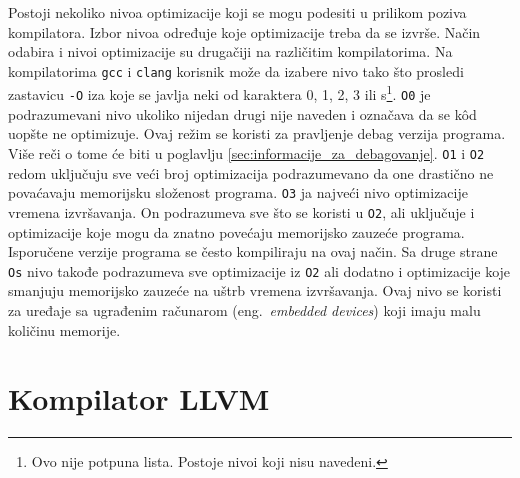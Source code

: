 \documentclass[12pt,oneside]{memoir}
\begin{document}

Postoji nekoliko nivoa optimizacije koji se mogu podesiti u prilikom poziva kompilatora.
Izbor nivoa određuje koje optimizacije treba da se izvrše.
Način odabira i nivoi optimizacije su drugačiji na različitim kompilatorima.
Na kompilatorima \verb|gcc| i \verb|clang| korisnik može da izabere nivo tako što prosledi zastavicu \verb|-O| iza koje se javlja neki od karaktera 0, 1, 2, 3 ili s\footnote{Ovo nije potpuna lista. Postoje nivoi koji nisu navedeni.}.
\verb|O0| je podrazumevani nivo ukoliko nijedan drugi nije naveden i označava da se k\^od uopšte ne optimizuje.
Ovaj režim se koristi za pravljenje debag verzija programa.
Više reči o tome će biti u poglavlju \ref{sec:informacije_za_debagovanje}.
\verb|O1| i \verb|O2| redom uključuju sve veći broj optimizacija podrazumevano da one drastično ne povaćavaju memorijsku složenost programa.
\verb|O3| ja najveći nivo optimizacije vremena izvršavanja.
On podrazumeva sve što se koristi u \verb|O2|, ali uključuje i optimizacije koje mogu da znatno povećaju memorijsko zauzeće programa.
Isporučene verzije programa se često kompiliraju na ovaj način.
Sa druge strane \verb|Os| nivo takođe podrazumeva sve optimizacije iz \verb|O2| ali dodatno i optimizacije koje smanjuju memorijsko zauzeće na uštrb vremena izvršavanja.
Ovaj nivo se koristi za uređaje sa ugrađenim računarom (eng.~{\em embedded devices}) koji imaju malu količinu memorije.

\section{Kompilator LLVM}

\end{document}
